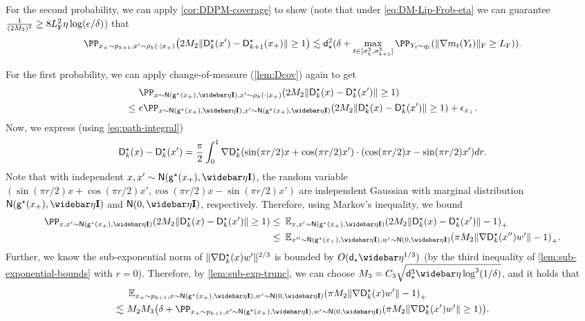 For the second probability, we can apply \cref{cor:DDPM-coverage} to show (note that under \cref{eq:DM-Lip-Frob-eta} we can guarantee $\frac{1}{(2M_2)^2}\geq 8L_{\rm F}^2\eta\log(e/\delta)$) that
\begin{align*}
    \PP_{x_+\sim p_{k+1}, x'\sim \rho_k(\cdot\mid x_+)}\prn*{2M_2\nrm{\Ds_k(x')-\Ds_{k+1}(x_+)}\geq 1}\leqsim \dstar^2(\delta+\max_{t\in[\sigma_k^2,\sigma_{k+1}^2]}\PP_{Y_t\sim q_t}\prn*{\nrmF{\nabla m_t(Y_t)}\geq \LF}). 
\end{align*}

For the first probability, we can apply change-of-measure (\cref{lem:Dcov}) again to get
\begin{align*}
    &~\PP_{x\sim \normal{\gds(x_+), \etabar\Id}, x'\sim \rho_k(\cdot\mid x_+)}\prn*{2M_2\nrm{\Ds_k(x)-\Ds_k(x')}\geq 1} \\
    \leq&~ e\PP_{x\sim \normal{\gds(x_+), \etabar\Id}, x'\sim \normal{\gds(x_+), \etabar\Id}}\prn*{2M_2\nrm{\Ds_k(x)-\Ds_k(x')}\geq 1}+\eps_{x_+}.
\end{align*}
Now, we express (using \eqref{eq:path-integral})
\begin{align*}
    \mathsf{D}^\star_k(x)-\mathsf{D}^\star_k(x')=\frac{\pi}{2}\int_0^1 \nabla \mathsf{D}^\star_k(\sin(\pi r/2) x+\cos(\pi r/2) x')\cdot (\cos(\pi r/2) x-\sin(\pi r/2) x') dr.
\end{align*}
Note that with independent $x,x'\sim \normal{\gds(x_+), \etabar\Id}$, the random variable $(\sin(\pi r/2) x+\cos(\pi r/2) x',\cos(\pi r/2) x-\sin(\pi r/2) x')$ are independent Gaussian with marginal distribution $\normal{\gds(x_+), \etabar\Id}$ and $\normal{0, \etabar\Id}$, respectively. Therefore, using Markov's inequality, we bound
\begin{align*}
    \PP_{x,x'\sim \normal{\gds(x_+), \etabar\Id}}\prn*{2M_2\nrm{\Ds_k(x)-\Ds_k(x')}\geq 1}
    \leq &~\En_{x,x'\sim \normal{\gds(x_+), \etabar\Id}}\prn*{2M_2\nrm{\Ds_k(x)-\Ds_k(x')}-1}_+ \\
    \leq&~ \En_{x''\sim \normal{\gds(x_+), \etabar\Id}, w'\sim \normal{0, \etabar\Id}}\prn*{\pi M_2\nrm{\nabla \Ds_k(x'')w'}-1}_+.
\end{align*}
Further, we know the sub-exponential norm of $\lVert\nabla \mathsf{D}^\star_k(x)w'\rVert^{2/3}$ is bounded by $O(\dbar \etabar^{1/3})$ (by the third inequality of \cref{lem:sub-exponential-bounds} with $r=0$). Therefore, by \cref{lem:sub-exp-trunc}, we can choose $M_3=C_3\sqrt{\dbar^3 \etabar \log^3(1/\delta)}$, and it holds that
\begin{align*}
    &~\En_{x_+\sim p_{k+1}, x\sim \normal{\gds(x_+), \etabar\Id}, w'\sim \normal{0, \etabar\Id}}\prn*{\pi M_2\nrm{\nabla \Ds_k(x)w'}-1}_+ \\
    \leqsim&~ M_2 M_3\prn*{ \delta+ \PP_{x_+\sim p_{k+1}, x'\sim \normal{\gds(x_+), \etabar\Id}, w'\sim \normal{0, \etabar\Id}}\prn*{\pi M_2\nrm{\nabla \Ds_k(x')w'}\geq 1} }.
\end{align*}
